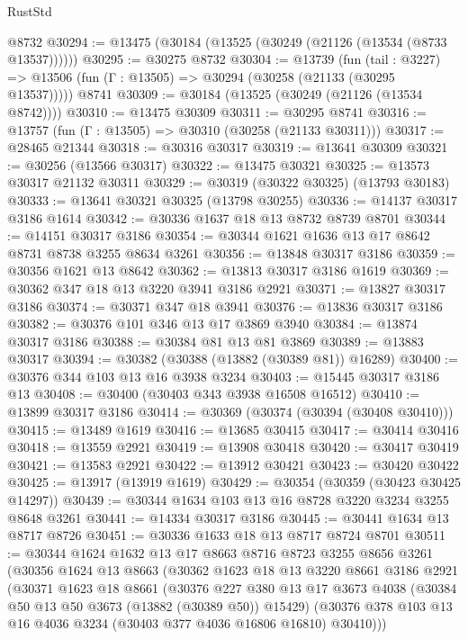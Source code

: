 \begin{lexlean}{RustStd}
\begin{coremodule}
    @8732
@30294 := @13475 (@30184 (@13525 (@30249 (@21126 (@13534 (@8733 @13537))))))
@30295 := @30275 @8732
@30304 := @13739
    (fun (tail : @3227) => @13506 (fun (Γ : @13505) => @30294 (@30258 (@21133 (@30295 @13537)))))
    @8741
@30309 := @30184 (@13525 (@30249 (@21126 (@13534 @8742))))
@30310 := @13475 @30309
@30311 := @30295 @8741
@30316 := @13757 (fun (Γ : @13505) => @30310 (@30258 (@21133 @30311)))
@30317 := @28465 @21344
@30318 := @30316 @30317
@30319 := @13641 @30309
@30321 := @30256 (@13566 @30317)
@30322 := @13475 @30321
@30325 := @13573 @30317 @21132 @30311
@30329 := @30319 (@30322 @30325) (@13793 @30183)
@30333 := @13641 @30321 @30325 (@13798 @30255)
@30336 := @14137 @30317 @3186 @1614
@30342 := @30336 @1637 @18 @13 @8732 @8739 @8701
@30344 := @14151 @30317 @3186
@30354 := @30344 @1621 @1636 @13 @17 @8642 @8731 @8738 @3255 @8634 @3261
@30356 := @13848 @30317 @3186
@30359 := @30356 @1621 @13 @8642
@30362 := @13813 @30317 @3186 @1619
@30369 := @30362 @347 @18 @13 @3220 @3941 @3186 @2921
@30371 := @13827 @30317 @3186
@30374 := @30371 @347 @18 @3941
@30376 := @13836 @30317 @3186
@30382 := @30376 @101 @346 @13 @17 @3869 @3940
@30384 := @13874 @30317 @3186
@30388 := @30384 @81 @13 @81 @3869
@30389 := @13883 @30317
@30394 := @30382 (@30388 (@13882 (@30389 @81)) @16289)
@30400 := @30376 @344 @103 @13 @16 @3938 @3234
@30403 := @15445 @30317 @3186 @13
@30408 := @30400 (@30403 @343 @3938 @16508 @16512)
@30410 := @13899 @30317 @3186
@30414 := @30369 (@30374 (@30394 (@30408 @30410)))
@30415 := @13489 @1619
@30416 := @13685 @30415
@30417 := @30414 @30416
@30418 := @13559 @2921
@30419 := @13908 @30418
@30420 := @30417 @30419
@30421 := @13583 @2921
@30422 := @13912 @30421
@30423 := @30420 @30422
@30425 := @13917 (@13919 @1619)
@30429 := @30354 (@30359 (@30423 @30425 @14297))
@30439 := @30344 @1634 @103 @13 @16 @8728 @3220 @3234 @3255 @8648 @3261
@30441 := @14334 @30317 @3186
@30445 := @30441 @1634 @13 @8717 @8726
@30451 := @30336 @1633 @18 @13 @8717 @8724 @8701
@30511 := @30344
    @1624
    @1632
    @13
    @17
    @8663
    @8716
    @8723
    @3255
    @8656
    @3261
    (@30356
      @1624
      @13
      @8663
      (@30362
        @1623
        @18
        @13
        @3220
        @8661
        @3186
        @2921
        (@30371
          @1623
          @18
          @8661
          (@30376
            @227
            @380
            @13
            @17
            @3673
            @4038
            (@30384 @50 @13 @50 @3673 (@13882 (@30389 @50)) @15429)
            (@30376 @378 @103 @13 @16 @4036 @3234 (@30403 @377 @4036 @16806 @16810) @30410)))

\end{coremodule}
\end{lexlean}
